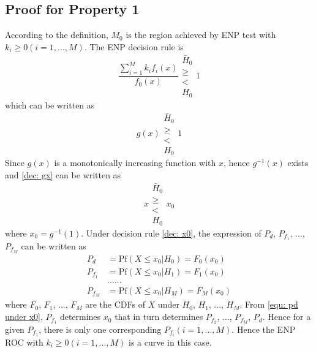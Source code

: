 \documentclass[12pt,journal,a4paper,twoside,onecolumn]{IEEEtran}
\begin{document}
\begin{spacing}{2.5}
\subsection{Proof for Property 1}
According to the definition, $M_0$ is the region achieved by ENP test with $k_i \geq 0 (i=1, ..., M)$. The ENP decision rule is
\begin{equation}
\frac{\sum_{i=1}^{M}k_if_i(x)}{f_0(x)} \substack{\bar{H}_0 \\\geq\\< \\H_0}1
\end{equation}
which can be written as
\begin{equation}
\label{dec: gx}
g(x)\substack{\bar{H}_0 \\\geq\\< \\H_0}1
\end{equation}
Since $g(x)$ is a monotonically increasing function with $x$, hence $g^{-1}(x)$ exists and \eqref{dec: gx} can be written as 
\begin{equation}
\label{dec: x0}
x\substack{\bar{H}_0 \\\geq\\< \\H_0}x_0
\end{equation}
where $x_0 = g^{-1}(1)$.
Under decision rule \eqref{dec: x0}, the expression of $P_d$, $P_{f_1}$, ..., $P_{f_M}$ can be written as 
\begin{equation}
\begin{split}
\label{equ: pd under x0}
P_d &= \text{Pf}(X \leq x_0 | H_0) = F_0(x_0)\\
P_{f_1} &= \text{Pf}(X \leq x_0 | H_1) = F_1(x_0)\\
  &......\\
P_{f_M} &= \text{Pf}(X \leq x_0 | H_M) = F_M(x_0)
\end{split}
\end{equation}
where $F_0$, $F_1$, ..., $F_M$ are the CDFs of $X$ under $H_0$, $H_1$, ..., $H_M$. From \eqref{equ: pd under x0}, $P_{f_1}$ determines $x_0$ that in turn determines $P_{f_2}$, ..., $P_{f_M}$, $P_d$. Hence for a given $P_{f_1}$, there is only one corresponding $P_{f_i} (i= 1, ..., M)$. Hence the ENP ROC with $k_i \geq 0 (i = 1, ..., M)$ is a curve in this case.


\end{spacing}
\end{document}
